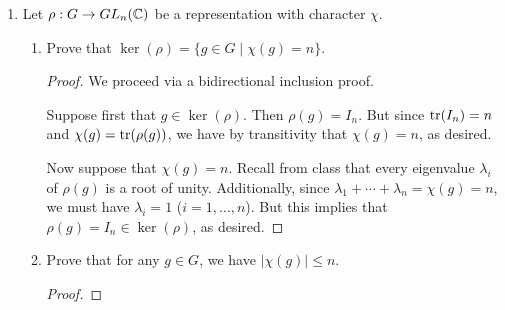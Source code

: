 \documentclass[../psets.tex]{subfiles}
\begin{document}
\begin{enumerate}
\begin{enumerate}
\begin{proof}
            To prove the claim, it will suffice to prove the stronger condition that $(\Hom_F(V,W))^G=\Hom_G(V,W)$ as sets. We will proceed via a bidirectional inclusion proof. Let's begin.\footnote{Note: Beware rampant abuses of notation throughout this proof. For example, the statement $gf=fg$ stands in for the much more complex $\rho_V(g)\circ f=f\circ\rho_W(g)$.}\par
            First, let $f\in(\Hom_F(V,W))^G$ be arbitrary. Then by the definition of the space of invariants, $g\cdot f=f$ for all $g\in G$. Additionally, since $G\acts\Hom_F(V,W)$ via $g\cdot f=gfg^{-1}$, we have that $gfg^{-1}=f$, i.e., $gf=fg$ for all $g\in G$. But this implies that $f$ is a morphism of $G$-representations, i.e., $f\in\Hom_G(V,W)$, as desired.\par
            The proof is symmetric in the reverse direction.
        \end{proof}
    \end{enumerate}
    \pagebreak
    \item Let $\rho:G\to GL_n(\mathbb{C})$ be a representation with character $\chi$.
    \begin{enumerate}
        \item Prove that $\ker(\rho)=\{g\in G\mid\chi(g)=n\}$.
        \begin{proof}
            We proceed via a bidirectional inclusion proof.\par
            Suppose first that $g\in\ker(\rho)$. Then $\rho(g)=I_n$. But since $\tr(I_n)=n$ and $\chi(g)=\tr(\rho(g))$, we have by transitivity that $\chi(g)=n$, as desired.\par
            Now suppose that $\chi(g)=n$. Recall from class that every eigenvalue $\lambda_i$ of $\rho(g)$ is a root of unity. Additionally, since $\lambda_1+\cdots+\lambda_n=\chi(g)=n$, we must have $\lambda_i=1$ ($i=1,\dots,n$). But this implies that $\rho(g)=I_n\in\ker(\rho)$, as desired.
        \end{proof}
        \item Prove that for any $g\in G$, we have $|\chi(g)|\leq n$.
        \begin{proof}


\end{proof}
\end{enumerate}
\end{enumerate}
\end{document}
